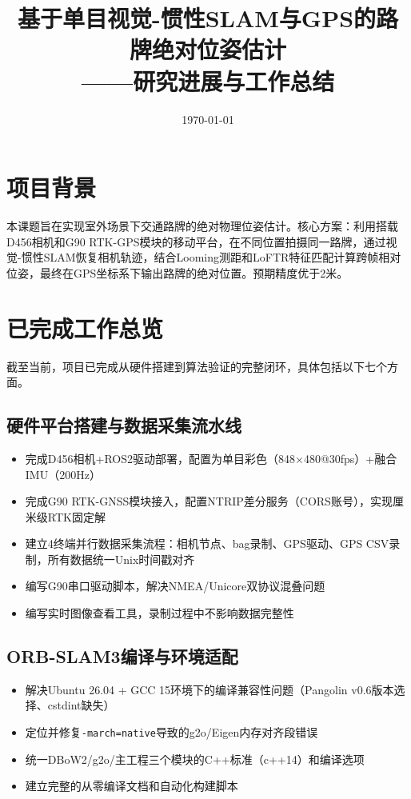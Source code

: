\documentclass[12pt,a4paper]{ctexart}
\title{\textbf{基于单目视觉-惯性SLAM与GPS的路牌绝对位姿估计}\\——研究进展与工作总结}
\author{}
\date{\today}
\begin{document}
\maketitle
\tableofcontents
\newpage

\section{项目背景}

本课题旨在实现室外场景下交通路牌的绝对物理位姿估计。核心方案：利用搭载D456相机和G90 RTK-GPS模块的移动平台，在不同位置拍摄同一路牌，通过视觉-惯性SLAM恢复相机轨迹，结合Looming测距和LoFTR特征匹配计算跨帧相对位姿，最终在GPS坐标系下输出路牌的绝对位置。预期精度优于2米。

\section{已完成工作总览}

截至当前，项目已完成从硬件搭建到算法验证的完整闭环，具体包括以下七个方面。

\subsection{硬件平台搭建与数据采集流水线}

\begin{itemize}
    \item 完成D456相机+ROS2驱动部署，配置为单目彩色（848$\times$480@30fps）+融合IMU（200Hz）
    \item 完成G90 RTK-GNSS模块接入，配置NTRIP差分服务（CORS账号），实现厘米级RTK固定解
    \item 建立4终端并行数据采集流程：相机节点、bag录制、GPS驱动、GPS CSV录制，所有数据统一Unix时间戳对齐
    \item 编写G90串口驱动脚本，解决NMEA/Unicore双协议混叠问题
    \item 编写实时图像查看工具，录制过程中不影响数据完整性
\end{itemize}

\subsection{ORB-SLAM3编译与环境适配}

\begin{itemize}
    \item 解决Ubuntu 26.04 + GCC 15环境下的编译兼容性问题（Pangolin v0.6版本选择、cstdint缺失）
    \item 定位并修复\texttt{-march=native}导致的g2o/Eigen内存对齐段错误
    \item 统一DBoW2/g2o/主工程三个模块的C++标准（c++14）和编译选项
    \item 建立完整的从零编译文档和自动化构建脚本
\end{itemize}
\end{document}
